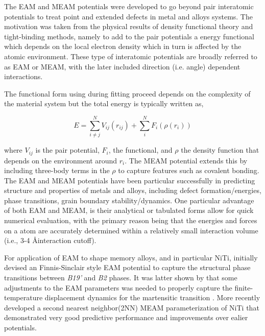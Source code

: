 \documentclass[preprint,colorlinks=true,linkcolor=black,citecolor=black]{elsarticle}
\begin{document}
The EAM and MEAM potentials were developed to go beyond pair interatomic potentials to treat point and extended defects in metal and alloys systems. The motivation was taken from the physical results of  density functional theory and tight-binding methods, namely to add to the pair potentials a energy functional which depends on the local electron density which in turn is affected by the atomic environment. These type of interatomic potentials are broadly referred to as EAM or MEAM, with the later included direction (i.e. angle) dependent interactions. \par

The functional form using during fitting proceed depends on the complexity of the material system but the total energy is typically written as,

\begin{equation}
  \label{eq:eam}
  E = \sum_{i\neq j}^N V_{ij}(r_{ij}) + \sum_i^N F_i\left(\rho(r_i)\right)
\end{equation}

where $V_{ij}$ is the pair potential, $F_i$, the functional, and $\rho$ the density function that depends on the environment around $r_i$. The MEAM potential extends this by including three-body terms in the $\rho$ to capture features such as covalent bonding. The EAM and MEAM potentials have been particular successfully in predicting structure and properties of metals and alloys, including defect formation/energies, phase transitions, grain boundary stability/dynamics. One particular advantage of both EAM and MEAM, is their analytical or tabulated forms allow for quick numerical evaluation, with the primary reason being that the energies and forces on a atom are accurately determined within a relatively small interaction volume (i.e., 3-4 \AA interaction cutoff).  \par

For application of EAM to shape memory alloys, and in particular NiTi, \citet{Mutter2010} initially devised an Finnis-Sinclair style EAM potential to capture the structural phase transitions between \textit{B19'} and \textit{B2} phases. It was latter shown by \cite{Zhong2011} that some adjustments to the EAM parameters was needed to properly capture the finite-temperature displacement dynamics for the martensitic transition \cite{Gur2017}. More recently \citet{Ko2015} developed a second nearest neighbor(2NN) MEAM parameterization of NiTi that demonstrated very good predictive performance and improvements over ealier potentials.   
\end{document}
